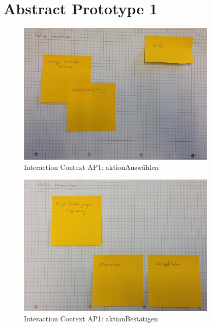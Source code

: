 
\chapter{Abstract Prototype 1}

\begin{figure}[H]
\centering
\includegraphics[width=0.85\textwidth]{./images/abstract/version1/aktionAuswaehlen.JPG}
\caption{Interaction Context AP1: aktionAuswählen}
\label{interfaceContents20}
\end{figure}

\begin{figure}[H]
\centering
\includegraphics[width=0.85\textwidth]{./images/abstract/version1/aktionBestaetigen.JPG}
\caption{Interaction Context AP1: aktionBestätigen}
\label{interfaceContents21}
\end{figure}


